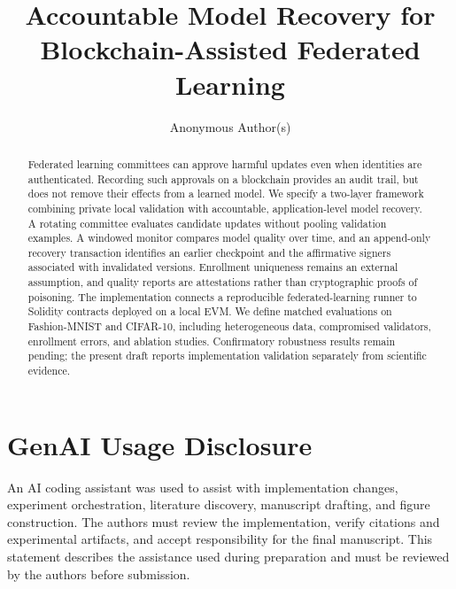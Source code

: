 \documentclass[sigconf,anonymous]{acmart}
\title{Accountable Model Recovery for Blockchain-Assisted Federated Learning}
\author{Anonymous Author(s)}
\begin{document}
\begin{abstract}
Federated learning committees can approve harmful updates even when identities
are authenticated. Recording such approvals on a blockchain provides an audit
trail, but does not remove their effects from a learned model. We specify a
two-layer framework combining private local validation with accountable,
application-level model recovery. A rotating committee evaluates candidate
updates without pooling validation examples. A windowed monitor compares model
quality over time, and an append-only recovery transaction identifies an earlier
checkpoint and the affirmative signers associated with invalidated versions.
Enrollment uniqueness remains an external assumption, and quality reports are
attestations rather than cryptographic proofs of poisoning. The implementation
connects a reproducible federated-learning runner to Solidity contracts deployed
on a local EVM. We define matched evaluations on Fashion-MNIST and CIFAR-10,
including heterogeneous data, compromised validators, enrollment errors, and
ablation studies. Confirmatory robustness results remain pending; the present
draft reports implementation validation separately from scientific evidence.
\end{abstract}
\maketitle
\begin{center}
\end{center}









\section*{GenAI Usage Disclosure}
An AI coding assistant was used to assist with implementation changes, experiment
orchestration, literature discovery, manuscript drafting, and figure construction.
The authors must review the implementation, verify citations and experimental
artifacts, and accept responsibility for the final manuscript. This statement
describes the assistance used during preparation and must be reviewed by the
authors before submission.


\end{document}
